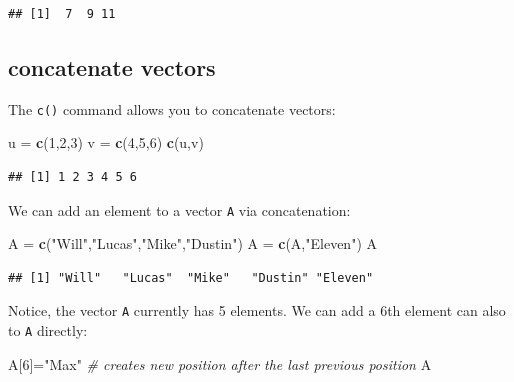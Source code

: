 \documentclass[
]{book}
\newenvironment{Shaded}{\begin{snugshade}}{\end{snugshade}}
\newcommand{\CommentTok}[1]{\textcolor[rgb]{0.56,0.35,0.01}{\textit{#1}}}
\newcommand{\DecValTok}[1]{\textcolor[rgb]{0.00,0.00,0.81}{#1}}
\newcommand{\FunctionTok}[1]{\textcolor[rgb]{0.13,0.29,0.53}{\textbf{#1}}}
\newcommand{\NormalTok}[1]{#1}
\newcommand{\OtherTok}[1]{\textcolor[rgb]{0.56,0.35,0.01}{#1}}
\newcommand{\StringTok}[1]{\textcolor[rgb]{0.31,0.60,0.02}{#1}}
\theoremstyle{definition}
\theoremstyle{definition}
\theoremstyle{definition}
\theoremstyle{definition}
\theoremstyle{remark}
\begin{document}
\begin{verbatim}
## [1]  7  9 11
\end{verbatim}

\subsection*{concatenate vectors}\label{concatenate-vectors}

The \texttt{c()} command allows you to concatenate vectors:

\begin{Shaded}
\begin{Highlighting}[]
\NormalTok{u }\OtherTok{=} \FunctionTok{c}\NormalTok{(}\DecValTok{1}\NormalTok{,}\DecValTok{2}\NormalTok{,}\DecValTok{3}\NormalTok{)}
\NormalTok{v }\OtherTok{=} \FunctionTok{c}\NormalTok{(}\DecValTok{4}\NormalTok{,}\DecValTok{5}\NormalTok{,}\DecValTok{6}\NormalTok{)}
\FunctionTok{c}\NormalTok{(u,v)}
\end{Highlighting}
\end{Shaded}

\begin{verbatim}
## [1] 1 2 3 4 5 6
\end{verbatim}

We can add an element to a vector \texttt{A} via concatenation:

\begin{Shaded}
\begin{Highlighting}[]
\NormalTok{A }\OtherTok{=} \FunctionTok{c}\NormalTok{(}\StringTok{"Will"}\NormalTok{,}\StringTok{"Lucas"}\NormalTok{,}\StringTok{"Mike"}\NormalTok{,}\StringTok{"Dustin"}\NormalTok{)}
\NormalTok{A }\OtherTok{=} \FunctionTok{c}\NormalTok{(A,}\StringTok{"Eleven"}\NormalTok{)}
\NormalTok{A}
\end{Highlighting}
\end{Shaded}

\begin{verbatim}
## [1] "Will"   "Lucas"  "Mike"   "Dustin" "Eleven"
\end{verbatim}

Notice, the vector \texttt{A} currently has 5 elements. We can add a 6th element can also to \texttt{A} directly:

\begin{Shaded}
\begin{Highlighting}[]
\NormalTok{A[}\DecValTok{6}\NormalTok{]}\OtherTok{=}\StringTok{"Max"} \CommentTok{\# creates new position after the last previous position}
\NormalTok{A}
\end{Highlighting}
\end{Shaded}
\end{document}
